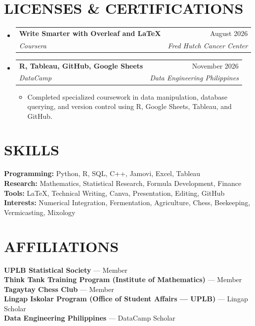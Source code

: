 \documentclass[letterpaper,11pt]{article}
\makeatletter
\newcommand{\resumeItem}[1]{
  \item \small{#1}
}
\newcommand{\resumeSubheading}[4]{
\item
\begin{tabular*}{\textwidth}{l@{\extracolsep{\fill}}r}
\textbf{#1} & {\small #2} \\
\textit{#3} & \textit{\small #4} \\
\end{tabular*}
}
\makeatother
\begin{document}
\section{LICENSES \& CERTIFICATIONS}
\begin{itemize}[leftmargin=0in, label={}]

\resumeSubheading
{Write Smarter with Overleaf and LaTeX}{August 2026}
{Coursera}{Fred Hutch Cancer Center}

\resumeSubheading
{R, Tableau, GitHub, Google Sheets}{November 2026}
{DataCamp}{Data Engineering Philippines}

\begin{itemize}
    \resumeItem{Completed specialized coursework in data manipulation, database querying, and version control using R, Google Sheets, Tableau, and GitHub. }
\end{itemize}




\end{itemize}

\section{SKILLS}
\small{
\textbf{Programming:} Python, R, SQL, C++, Jamovi, Excel, Tableau \\
\textbf{Research:} Mathematics, Statistical Research, Formula Development, Finance \\
\textbf{Tools:} LaTeX, Technical Writing, Canva, Presentation, Editing, GitHub \\
\textbf{Interests:} Numerical Integration, Fermentation, Agriculture, Chess, Beekeeping, Vermicasting, Mixology
}
\vspace{-5pt}


\section{AFFILIATIONS}
\small{
\textbf{UPLB Statistical Society} --- Member \\
\textbf{Think Tank Training Program (Institute of Mathematics)} --- Member \\
\textbf{Tagaytay Chess Club} --- Member \\
\textbf{Lingap Iskolar Program (Office of Student Affairs --- UPLB)} --- Lingap Scholar\\

\textbf{Data Engineering Philippines} --- DataCamp Scholar
}

\newpage
\end{document}
